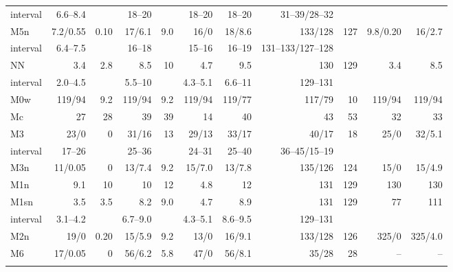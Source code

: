 \documentclass[pdflatex,sn-basic,lineno]{sn-jnl}
\providecommand{\DIFaddendFL}{} %
\DeclareRobustCommand{\DIFaddendFL}{\DIFOaddendFL \let\includegraphics\DIFOincludegraphics} %
\begin{document}
\begin{table}[t]
\begin{tabular}{@{}lrrrrrrrrrr@{}}
\quad interval & 6.6--8.4 &  & 18--20 &  & 18--20 & 18--20 & 31--39/28--32 &  &  & \\
M5n & 7.2/0.55 & 0.10 & 17/6.1 & 9.0 & 16/0 & 18/8.6 & 133/128 & 127 & 9.8/0.20 & 16/2.7 \\
\quad interval & 6.4--7.5 &  & 16--18 &  & 15--16 & 16--19 & 131--133/127--128 &  &  & \\
NN & 3.4 & 2.8 & 8.5 & 10 & 4.7 & 9.5 & 130 & 129 & 3.4 & 8.5 \\
\quad interval & 2.0--4.5 &  & 5.5--10 &  & 4.3--5.1 & 6.6--11 & 129--131 &  &  & \\
\midrule M0w & 119/94 & 9.2 & 119/94 & 9.2 & 119/94 & 119/77 & 117/79 & 10 & 119/94 & 119/94 \\
Mc & 27 & 28 & 39 & 39 & 14 & 40 & 43 & 53 & 32 & 33 \\
M3 & 23/0 & 0 & 31/16 & 13 & 29/13 & 33/17 & 40/17 & 18 & 25/0 & 32/5.1 \\
\quad interval & 17--26 &  & 25--36 &  & 24--31 & 25--40 & 36--45/15--19 &  &  & \\
M3n & 11/0.05 & 0 & 13/7.4 & 9.2 & 15/7.0 & 13/7.8 & 135/126 & 124 & 15/0 & 15/4.9 \\
M1n & 9.1 & 10 & 10 & 12 & 4.8 & 12 & 131 & 129 & 130 & 130 \\
M1sn & 3.5 & 3.5 & 8.2 & 9.0 & 4.7 & 8.9 & 131 & 129 & 77 & 111 \\
\quad interval & 3.1--4.2 &  & 6.7--9.0 &  & 4.3--5.1 & 8.6--9.5 & 129--131 &  &  & \\
M2n & 19/0 & 0.20 & 15/5.9 & 9.2 & 13/0 & 16/9.1 & 133/128 & 126 & 325/0 & 325/4.0 \\
M6 & 17/0.05 & 0 & 56/6.2 & 5.8 & 47/0 & 56/8.1 & 35/28 & 28 & -- & -- \\
\botrule
\end{tabular}
\DIFaddendFL {}
\end{table}
\end{document}
